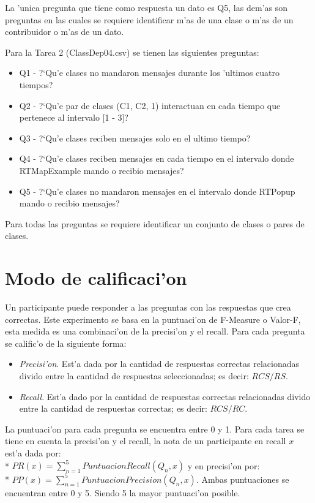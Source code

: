 La 'unica pregunta que tiene como respuesta un dato es Q5, las dem'as son preguntas en las cuales se requiere identificar m'as de una clase o m'as de un contribuidor o m'as de un dato.

Para la Tarea 2 (ClassDep04.csv) se tienen las siguientes preguntas:
\begin{itemize}
\item Q1 - ?`Qu'e clases no mandaron mensajes durante los 'ultimos cuatro tiempos?
\item Q2 - ?`Qu'e par de clases (C1, C2, 1) interactuan en cada tiempo que pertenece al intervalo [1 - 3]?
\item Q3 - ?`Qu'e clases reciben mensajes solo en el ultimo tiempo?
\item Q4 - ?`Qu'e clases reciben mensajes en cada tiempo en el intervalo donde RTMapExample mando o recibio mensajes?
\item Q5 - ?`Qu'e clases no mandaron mensajes en el intervalo donde RTPopup mando o recibio mensajes?
\end{itemize}

Para todas las preguntas se requiere identificar un conjunto de clases o pares de clases.

\section{Modo de calificaci'on}
\label{sec:cali}
Un participante puede responder a las preguntas con las respuestas que crea correctas. Este experimento se basa en la puntuaci'on de F-Measure o Valor-F, esta medida es una combinaci'on de la precisi'on y el recall. Para cada pregunta se calific'o de la siguiente forma: 
\begin{itemize}
\item \emph{Precisi'on}. Est'a dada por la cantidad de respuestas correctas relacionadas divido entre la cantidad de respuestas seleccionadas; es decir: $RCS/RS$.
\item \emph{Recall}. Est'a dado por la cantidad de respuestas correctas relacionadas divido entre la cantidad de respuestas correctas; es decir: $RCS/RC$.
\end{itemize}
La puntuaci'on para cada pregunta se encuentra entre 0 y 1.
Para cada tarea se tiene en cuenta la precisi'on y el recall, la nota de un participante en recall $x$ est'a dada por: \\* $PR(x) = \sum_{n=1}^5 PuntuacionRecall(Q_n, x)$ y en precisi'on por:
\\* $PP(x) = \sum_{n=1}^5 PuntuacionPrecision(Q_n, x)$. Ambas puntuaciones se encuentran entre 0 y 5. Siendo 5 la mayor puntuaci'on posible.

